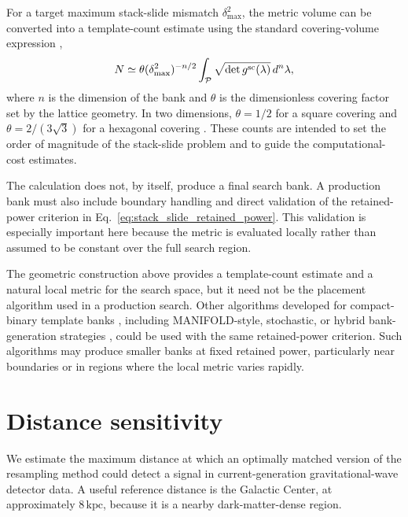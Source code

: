 \documentclass[aps,prd,amsmath,floats,floatfix, twocolumn,
superscriptaddress,nofootinbib,showpacs]{revtex4-2}
\begin{document}
For a target maximum stack-slide mismatch $\delta^2_{\max}$, the metric volume
can be converted into a template-count estimate using the standard
covering-volume expression \cite{DUMMY_Prix2007,DUMMY_Wette2014,DUMMY_Weave2018},
\begin{equation}
    N \simeq \theta
    (\delta^2_{\max})^{-n/2}
    \int_{\cal P}
    \sqrt{\det g^{\rm sc}(\lambda)}\,d^n\lambda ,
    \label{eq:standard_template_count}
\end{equation}
where $n$ is the dimension of the bank and $\theta$ is the dimensionless
covering factor set by the lattice geometry.  In two dimensions,
$\theta=1/2$ for a square covering and
$\theta=2/(3\sqrt{3})$ for a hexagonal covering
\cite{DUMMY_Prix2007,DUMMY_Wette2014}.  These counts are intended to set the
order of magnitude of the stack-slide problem and to guide the
computational-cost estimates.

The calculation does not, by itself, produce a final search bank.  A production
bank must also include boundary handling and direct validation of the
retained-power criterion in Eq.~\eqref{eq:stack_slide_retained_power}.  This
validation is especially important here because the metric is evaluated locally
rather than assumed to be constant over the full search region.

The geometric construction above provides a template-count estimate and a
natural local metric for the search space, but it need not be the placement
algorithm used in a production search.  Other algorithms developed for
compact-binary template banks \cite{Brown:2012nn}, including
MANIFOLD-style, stochastic, or hybrid bank-generation strategies
\cite{Hanna:2022zpk,Hanna:2024tom,Kacanja:2024pjh,Roy:2017oul,Roy:2017qgg},
could be used with the same retained-power criterion.  Such algorithms may
produce smaller banks at fixed retained power, particularly near boundaries or
in regions where the local metric varies rapidly.

\section{Distance sensitivity}
We estimate the maximum distance at which an optimally matched version of the resampling method could detect a signal in current-generation gravitational-wave detector data.  A useful reference distance is the Galactic Center, at approximately $8\,\mathrm{kpc}$, because it is a nearby dark-matter-dense region.
\end{document}
